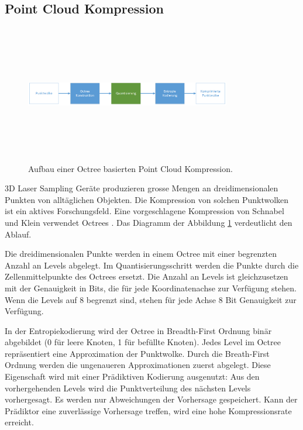 \subsection{Point Cloud Kompression} \label{state:pointcloud}
\begin{figure}[!htbp]
	\center
	\includegraphics[width=0.8\textwidth,height=6cm,keepaspectratio]{./pictures/state/pointcloud.png}
	\caption{Aufbau einer Octree basierten Point Cloud Kompression.}
	\label{state:pointcloud:abb}
\end{figure}
3D Laser Sampling Geräte produzieren grosse Mengen an dreidimensionalen Punkten von alltäglichen Objekten. Die Kompression von solchen Punktwolken ist ein aktives Forschungsfeld. Eine vorgeschlagene Kompression  von Schnabel und Klein \cite{schnabel2006octree} verwendet Octrees \cite{wiki:octree}. Das Diagramm der Abbildung \ref{state:pointcloud:abb} verdeutlicht den Ablauf.

Die dreidimensionalen Punkte werden in einem Octree mit einer begrenzten Anzahl an Levels abgelegt. Im Quantisierungsschritt werden die Punkte durch die Zellenmittelpunkte des Octrees ersetzt. Die Anzahl an Levels ist gleichzusetzen mit der Genauigkeit in Bits, die für jede Koordinatenachse zur Verfügung stehen. Wenn die Levels auf 8 begrenzt sind, stehen für jede Achse 8 Bit Genauigkeit zur Verfügung.

In der Entropiekodierung wird der Octree in Breadth-First Ordnung binär abgebildet (0 für leere Knoten, 1 für befüllte Knoten). Jedes Level im Octree repräsentiert eine Approximation der Punktwolke. Durch  die Breath-First Ordnung werden die ungenaueren Approximationen zuerst abgelegt. Diese Eigenschaft wird mit einer Prädiktiven Kodierung ausgenutzt: Aus den vorhergehenden Levels wird die Punktverteilung des nächsten Levels vorhergesagt. Es werden nur Abweichungen der Vorhersage gespeichert. Kann der Prädiktor eine zuverlässige Vorhersage treffen, wird eine hohe Kompressionsrate erreicht.

